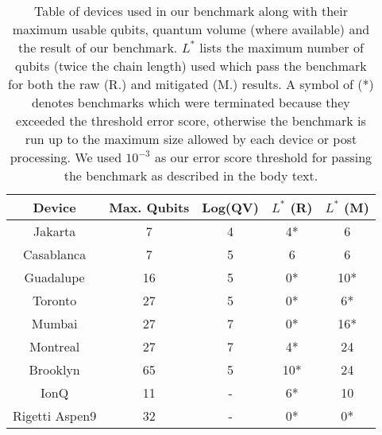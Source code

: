 \documentclass[
prx,
superscriptaddress,
twocolumn,
longbibliography
]{revtex4-1}
\begin{document}
\begin{table}[h!]
    \centering
    \begin{tabular}{|c|c|c|c|c|}
       \hline Device & Max. Qubits & Log(QV) & $L^*$ (R) &  $L^*$ (M)  \\
        \hline Jakarta & 7 & 4 & 4* & 6\\
        \hline Casablanca & 7 & 5 & 6 & 6\\
        \hline Guadalupe & 16 & 5 & 0* & 10*\\
        \hline Toronto & 27 & 5 & 0* & 6*\\
        \hline Mumbai & 27 & 7 & 0* & 16*\\
        \hline Montreal & 27 & 7  & 4* & 24\\
        \hline Brooklyn & 65 & 5  & 10* & 24\\
        \hline IonQ & 11 & -  & 6* & 10\\
        \hline Rigetti Aspen9 & 32 & -  & 0* & 0*\\
        \hline
    \end{tabular}
    \caption{Table of devices used in our benchmark along with their maximum usable qubits, quantum volume (where available) and the result of our benchmark. $L^*$ lists the maximum number of qubits (twice the chain length) used which pass the benchmark for both the raw (R.) and mitigated (M.) results. A symbol of (*) denotes benchmarks which were terminated because they exceeded the threshold error score, otherwise the benchmark is run up to the maximum size allowed by each device or post processing. We used $10^{-3}$ as our error score threshold for passing the benchmark as described in the body text.}
    \label{tbl:devices}
\end{table}

\end{document}
